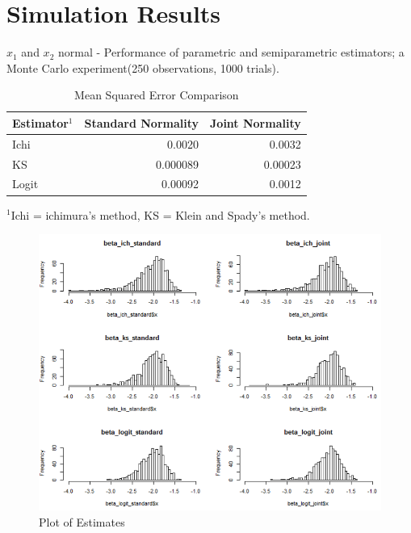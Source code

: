 \documentclass[a4paper]{article}
\begin{document}
\section{Simulation Results}

\begin{table}[H]
\caption {Mean Squared Error Comparison} \label{tab:mean squared error}

$x_1$ and $x_2$ normal - Performance of parametric and semiparametric estimators; a Monte Carlo experiment(250 observations, 1000 trials).
\centering
\begin{tabular}{l r r}

\toprule
Estimator$^1$ & \textbf{Standard Normality} & \textbf{Joint Normality} \tabularnewline\midrule
Ichi & 0.0020 & 0.0032
\tabularnewline
KS & 0.000089 & 0.00023
\tabularnewline 
Logit & 0.00092  & 0.0012
\tabularnewline
\bottomrule
\end{tabular}

$^1$Ichi = ichimura's method, KS = Klein and Spady's method.

\end{table}

\begin{figure}[h!]
  \caption{Plot of Estimates}
  \includegraphics[width=\linewidth]{plot_comparison.png}
 
  \label{fig:plot of estimates}
\end{figure}
\end{document}
